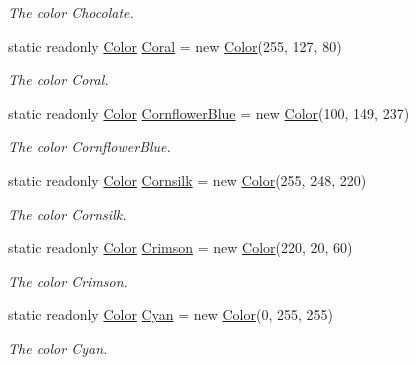 \begin{DoxyCompactItemize}
\begin{DoxyCompactList}\small\item\em The color Chocolate. \end{DoxyCompactList}\item 
static readonly \hyperlink{struct_tri_devs_1_1_tri_engine2_d_1_1_color}{Color} \hyperlink{struct_tri_devs_1_1_tri_engine2_d_1_1_color_ae9b0dca0da12afa288c2197c39dc57a7}{Coral} = new \hyperlink{struct_tri_devs_1_1_tri_engine2_d_1_1_color}{Color}(255, 127, 80)
\begin{DoxyCompactList}\small\item\em The color Coral. \end{DoxyCompactList}\item 
static readonly \hyperlink{struct_tri_devs_1_1_tri_engine2_d_1_1_color}{Color} \hyperlink{struct_tri_devs_1_1_tri_engine2_d_1_1_color_a2b092fb5f96859e8b44b9cfbe3bd08f6}{Cornflower\-Blue} = new \hyperlink{struct_tri_devs_1_1_tri_engine2_d_1_1_color}{Color}(100, 149, 237)
\begin{DoxyCompactList}\small\item\em The color Cornflower\-Blue. \end{DoxyCompactList}\item 
static readonly \hyperlink{struct_tri_devs_1_1_tri_engine2_d_1_1_color}{Color} \hyperlink{struct_tri_devs_1_1_tri_engine2_d_1_1_color_a1985da695d991f06b20d1478627be0da}{Cornsilk} = new \hyperlink{struct_tri_devs_1_1_tri_engine2_d_1_1_color}{Color}(255, 248, 220)
\begin{DoxyCompactList}\small\item\em The color Cornsilk. \end{DoxyCompactList}\item 
static readonly \hyperlink{struct_tri_devs_1_1_tri_engine2_d_1_1_color}{Color} \hyperlink{struct_tri_devs_1_1_tri_engine2_d_1_1_color_acb466803105e8843e6fb17c830b5ad33}{Crimson} = new \hyperlink{struct_tri_devs_1_1_tri_engine2_d_1_1_color}{Color}(220, 20, 60)
\begin{DoxyCompactList}\small\item\em The color Crimson. \end{DoxyCompactList}\item 
static readonly \hyperlink{struct_tri_devs_1_1_tri_engine2_d_1_1_color}{Color} \hyperlink{struct_tri_devs_1_1_tri_engine2_d_1_1_color_a687b24f1301993ac3e3a2ada68ef52d0}{Cyan} = new \hyperlink{struct_tri_devs_1_1_tri_engine2_d_1_1_color}{Color}(0, 255, 255)
\begin{DoxyCompactList}\small\item\em The color Cyan. \end{DoxyCompactList}\item 

\end{DoxyCompactItemize}
